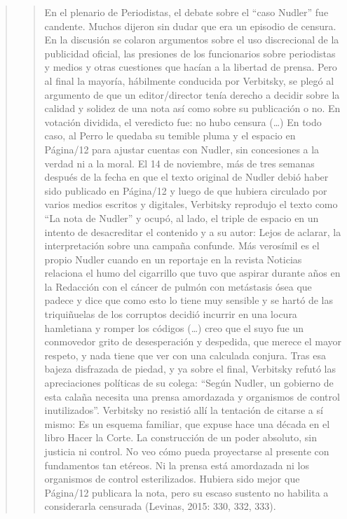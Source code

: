 \begin{quote}
\begin{quote}
	En el plenario de Periodistas, el debate sobre el \enquote{caso Nudler} fue candente. Muchos dijeron sin dudar que era un episodio de censura. En la discusión se colaron argumentos sobre el uso discrecional de la publicidad oficial, las presiones de los funcionarios sobre periodistas y medios y otras cuestiones que hacían a la libertad de prensa. Pero al final la mayoría, hábilmente conducida por Verbitsky, se plegó al argumento de que un editor/director tenía derecho a decidir sobre la calidad y solidez de una nota así como sobre su publicación o no. En votación dividida, el veredicto fue: no hubo censura (\dots) En todo caso, al Perro le quedaba su temible pluma y el espacio en Página/12 para ajustar cuentas con Nudler, sin concesiones a la verdad ni a la moral. El 14 de noviembre, más de tres semanas después de la fecha en que el texto original de Nudler debió haber sido publicado en Página/12 y luego de que hubiera circulado por varios medios escritos y digitales, Verbitsky reprodujo el texto como \enquote{La nota de Nudler} y ocupó, al lado, el triple de espacio en un intento de desacreditar el contenido y a su autor: Lejos de aclarar, la interpretación sobre una campaña confunde. Más verosímil es el propio Nudler cuando en un reportaje en la revista Noticias relaciona el humo del cigarrillo que tuvo que aspirar durante años en la Redacción con el cáncer de pulmón con metástasis ósea que padece y dice que como esto lo tiene muy sensible y se hartó de las triquiñuelas de los corruptos decidió incurrir en una locura hamletiana y romper los códigos (\dots) creo que el suyo fue un conmovedor grito de desesperación y despedida, que merece el mayor respeto, y nada tiene que ver con una calculada conjura. Tras esa bajeza disfrazada de piedad, y ya sobre el final, Verbitsky refutó las apreciaciones políticas de su colega: \enquote{Según Nudler, un gobierno de esta calaña necesita una prensa amordazada y organismos de control inutilizados}. Verbitsky no resistió allí la tentación de citarse a sí mismo: Es un esquema familiar, que expuse hace una década en el libro Hacer la Corte. La construcción de un poder absoluto, sin justicia ni control. No veo cómo pueda proyectarse al presente con fundamentos tan etéreos. Ni la prensa está amordazada ni los organismos de control esterilizados. Hubiera sido mejor que Página/12 publicara la nota, pero su escaso sustento no habilita a considerarla censurada (Levinas, 2015: 330, 332, 333).
\end{quote}



\end{quote}
